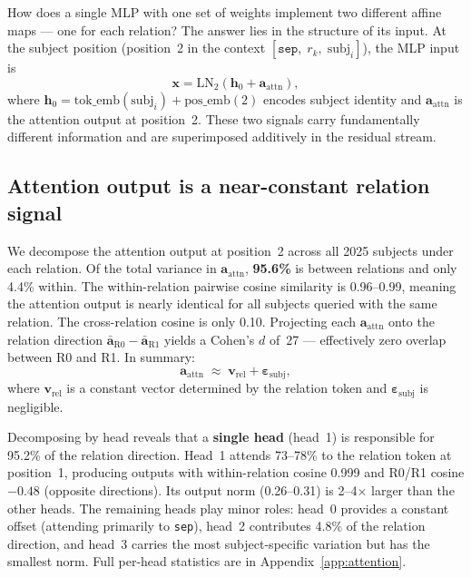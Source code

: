 \documentclass[11pt,a4paper]{article}
\newcommand{\bh}{\mathbf{h}}
\newcommand{\bx}{\mathbf{x}}
\newcommand{\ba}{\mathbf{a}}
\newcommand{\bv}{\mathbf{v}}
\newcommand{\lnorm}{\mathrm{LN}}
\newcommand{\attnout}{\mathbf{a}_{\mathrm{attn}}}
\begin{document}
How does a single MLP with one set of weights implement two different
affine maps --- one for each relation? The answer lies in the
structure of its input. At the subject position (position~2 in the
context $[\texttt{sep},\; r_k,\; \text{subj}_i]$), the MLP input is
\begin{equation}
\bx = \lnorm_2(\bh_0 + \attnout),
\label{eq:mlp_input}
\end{equation}
where $\bh_0 = \mathrm{tok\_emb}(\text{subj}_i) +
\mathrm{pos\_emb}(2)$ encodes subject identity and $\attnout$ is the
attention output at position~2. These two signals carry fundamentally
different information and are superimposed additively in the residual
stream.

\subsection{Attention output is a near-constant relation signal}
\label{sec:attn_signal}

We decompose the attention output at position~2 across all 2025
subjects under each relation. Of the total variance in $\attnout$,
\textbf{95.6\%} is between relations and only 4.4\% within. The
within-relation pairwise cosine similarity is 0.96--0.99, meaning the
attention output is nearly identical for all subjects queried with the
same relation. The cross-relation cosine is only 0.10. Projecting
each $\attnout$ onto the relation direction $\bar{\ba}_{\text{R0}} -
\bar{\ba}_{\text{R1}}$ yields a Cohen's $d$ of~27 --- effectively
zero overlap between R0 and R1. In summary:
\begin{equation}
\attnout \;\approx\; \bv_{\text{rel}} + \boldsymbol{\varepsilon}_{\text{subj}},
\label{eq:attn_decomp}
\end{equation}
where $\bv_{\text{rel}}$ is a constant vector determined by the
relation token and $\boldsymbol{\varepsilon}_{\text{subj}}$ is
negligible.

Decomposing by head reveals that a \textbf{single head} (head~1) is
responsible for 95.2\% of the relation direction. Head~1 attends
73--78\% to the relation token at position~1, producing outputs with
within-relation cosine 0.999 and R0/R1 cosine $-0.48$ (opposite
directions). Its output norm (0.26--0.31) is 2--4$\times$ larger than
the other heads. The remaining heads play minor roles: head~0 provides
a constant offset (attending primarily to \texttt{sep}), head~2
contributes 4.8\% of the relation direction, and head~3 carries the
most subject-specific variation but has the smallest norm.  Full
per-head statistics are in Appendix~\ref{app:attention}.
\end{document}
